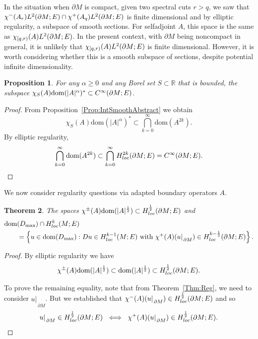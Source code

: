 \documentclass[a4paper,10pt,reqno]{amsart}
\newcommand{\rest}[1]{{{\lvert_{}}_{}}_{#1}}
\newcommand{\R}{\mathbb{R}}
\newcommand{\dbrac}[1]{\left\{#1\right\}}
\newcommand{\modulus}[1]{|#1|}
\newcommand{\set}[1]{\dbrac{#1}}
\newcommand{\Lp}[2][{}]{{\rm L}^{#2}_{\rm #1}}%
\newcommand{\Ck}[2][{}]{{\rm C}^{#2}_{\rm #1}}%
\newcommand{\Hard}[2][{}]{{\rm H}^{#2}_{\rm #1}}%
\newcommand{\SobH}[2][{}]{\Hard[#1]{\rm #2}}
\newcommand{\dom}{\mathrm{dom}}
\newcommand{\dM}{\partial M}
\newtheorem{theorem}{Theorem}[section]
\newtheorem{proposition}[theorem]{Proposition}
\theoremstyle{definition}
\begin{document}
In the situation when $\dM$ is compact, given two spectral cuts $r > q$, we saw that $\chi^-(A_r) \Lp{2}(\dM;E) \cap \chi^+(A_q) \Lp{2}(\dM;E)$ is finite dimensional and by elliptic regularity, a subspace of smooth sections.
For selfadjoint $A$, this space is the same as $\chi_{[q,r)}(A) \Lp{2}(\dM;E)$.
In the present context, with $\dM$ being noncompact in general, it is unlikely that $\chi_{[q,r)}(A) \Lp{2}(\dM;E)$ is finite dimensional.
However, it is worth considering whether this is a smooth subspace of sections, despite potential infinite dimensionality.

\begin{proposition}
\label{Prop:IntSmooth}
For any $\alpha\ge0$ and any Borel set $S \subset \R$ that is bounded, the subspace $\chi_{S}(A) \dom(\modulus{A}^{\alpha})^\ast  \subset \Ck{\infty}(\dM;E)$.
\end{proposition}
\begin{proof}
From Proposition~\ref{Prop:IntSmoothAbstract} we obtain
$$
\chi_{S}(A) \dom(\modulus{A}^{\alpha})^\ast  \subset \bigcap_{k=0}^\infty\dom(A^{2k}).
$$
By elliptic regularity,
\[
\bigcap_{k=0}^\infty\dom(A^{2k}) \subset \bigcap_{k=0}^\infty\SobH[loc]{2k}(\dM;E)=\Ck{\infty}(\dM;E).
\qedhere
\]
\end{proof}

We now consider regularity questions via adapted boundary operators $A$.

\begin{theorem}
\label{Thm:Reg2}
The spaces $\chi^{\pm}(A) \dom(\modulus{A}^{\frac12}) \subset \SobH[loc]{\frac12}(\dM;E)$ and
\begin{align*}
\dom&(D_{\max})\cap
\SobH[loc]{k}(M;E)                                                                                                               \\
&= 
\set{u \in \dom(D_{\max}): Du \in \SobH[loc]{k-1}(M;E)\ \text{with}\ \chi^+(A)(u\rest{\dM}) \in \SobH[loc]{k-\frac12}(\dM;E) } .
\end{align*}
\end{theorem}
\begin{proof}
By elliptic regularity we have
$$
\chi^{\pm}(A) \dom(\modulus{A}^{\frac12}) \subset \dom(\modulus{A}^{\frac12})\subset \SobH[loc]{\frac12}(\dM;E).
$$

To prove the remaining equality, note that from Theorem~\ref{Thm:Reg}, we need to consider $u\rest{\dM}$.
But we established that $\chi^-(A)(u \rest{\dM}) \in \SobH[loc]{\frac12}(\dM;E)$ and so
\begin{equation*}
u\rest\dM \in \SobH[loc]{\frac12}(\dM;E)\ \iff\ \chi^+(A)(u \rest{\dM}) \in  \SobH[loc]{\frac12}(\dM;E).
\qedhere
\end{equation*}
\end{proof}
\end{document}
